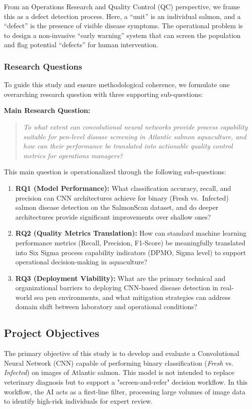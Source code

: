 \documentclass[12pt,a4paper]{article}
\begin{document}
From an Operations Research and Quality Control (QC) perspective, we frame this as a defect detection process. Here, a ``unit'' is an individual salmon, and a ``defect'' is the presence of visible disease symptoms. The operational problem is to design a non-invasive ``early warning'' system that can screen the population and flag potential ``defects'' for human intervention.

\subsubsection{Research Questions}
To guide this study and ensure methodological coherence, we formulate one overarching research question with three supporting sub-questions:

\textbf{Main Research Question:}
\begin{quote}
\emph{To what extent can convolutional neural networks provide process capability suitable for pen-level disease screening in Atlantic salmon aquaculture, and how can their performance be translated into actionable quality control metrics for operations managers?}
\end{quote}

This main question is operationalized through the following sub-questions:

\begin{enumerate}
    \item \textbf{RQ1 (Model Performance):} What classification accuracy, recall, and precision can CNN architectures achieve for binary (Fresh vs.\ Infected) salmon disease detection on the SalmonScan dataset, and do deeper architectures provide significant improvements over shallow ones?
    
    \item \textbf{RQ2 (Quality Metrics Translation):} How can standard machine learning performance metrics (Recall, Precision, F1-Score) be meaningfully translated into Six Sigma process capability indicators (DPMO, Sigma level) to support operational decision-making in aquaculture?
    
    \item \textbf{RQ3 (Deployment Viability):} What are the primary technical and organizational barriers to deploying CNN-based disease detection in real-world sea pen environments, and what mitigation strategies can address domain shift between laboratory and operational conditions?
\end{enumerate}

\subsection{Project Objectives}
The primary objective of this study is to develop and evaluate a Convolutional Neural Network (CNN) capable of performing binary classification (\emph{Fresh} vs. \emph{Infected}) on images of Atlantic salmon. This model is not intended to replace veterinary diagnosis but to support a "screen-and-refer" decision workflow. In this workflow, the AI acts as a first-line filter, processing large volumes of image data to identify high-risk individuals for expert review.
\end{document}
